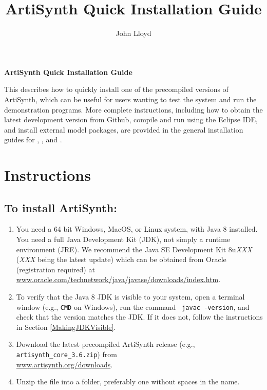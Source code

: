 \documentclass{article}
\title{ArtiSynth Quick Installation Guide}
\author{John Lloyd}
\date{}
\begin{document}

\iflatexml{\large\pubdate}\fi


\iflatexml\else
\begin{center}
\sffamily\Large\bfseries ArtiSynth Quick Installation Guide
\end{center}
\bigskip
\fi

This describes how to quickly install one of the precompiled versions
of ArtiSynth, which can be useful for users wanting to test the system
and run the demonstration programs. More complete instructions,
including how to obtain the latest development version from Github,
compile and run using the Eclipse IDE, and install external model
packages, are provided in the general installation guides for
, 
,
and 
.

\section{Instructions}

\subsection{To install ArtiSynth:}

\begin{enumerate}

\item You need a 64 bit Windows, MacOS, or Linux system, with Java 8
installed. You need a full Java Development Kit (JDK), not simply a
runtime environment (JRE). We recommend the Java SE Development Kit
8u{\it XXX} ({\it XXX} being the latest update) which can be obtained
from Oracle (registration required) at\\
\href{https://www.oracle.com/technetwork/java/javase/downloads/index.html}%
{www.oracle.com/technetwork/java/javase/downloads/index.htm}.
 
\item To verify that the Java 8 JDK is visible to your system, open a
terminal window (e.g., {\tt CMD} on Windows), run the command {\tt
javac -version}, and check that the version matches the JDK.  If it
does not, follow the instructions in Section
\ref{MakingJDKVisible}.

\item Download the latest precompiled ArtiSynth release 
(e.g., {\tt artisynth\_core\_3.6.zip}) from
\iflatexml\else\\\fi %
\href{https://www.artisynth.org/downloads}{www.artisynth.org/downloads}.
 
\item Unzip the file into a folder, preferably one without spaces in the
name.

\end{enumerate}
 
\end{document}
